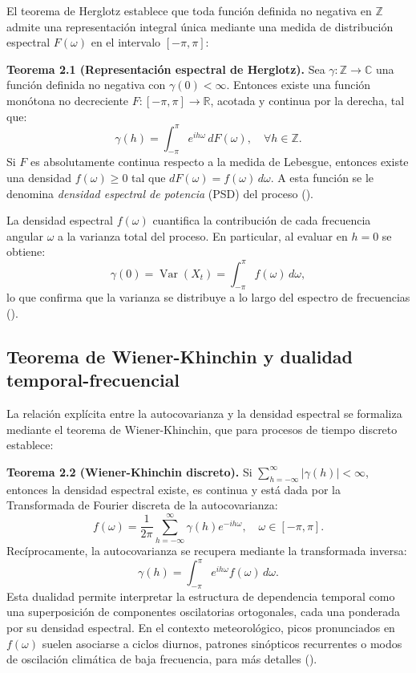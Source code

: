 \documentclass[
  spanish,
  us-letterpaper,
]{scrreprt}
\numberwithin{equation}{section}
\begin{document}
El teorema de Herglotz establece que toda función definida no negativa
en \(\mathbb{Z}\) admite una representación integral única mediante una
medida de distribución espectral \(F(\omega)\) en el intervalo
\([-\pi, \pi]\):

\textbf{Teorema 2.1 (Representación espectral de Herglotz).} Sea
\(\gamma: \mathbb{Z} \to \mathbb{C}\) una función definida no negativa
con \(\gamma(0) < \infty\). Entonces existe una función monótona no
decreciente \(F: [-\pi, \pi] \to \mathbb{R}\), acotada y continua por la
derecha, tal que: \[
\gamma(h) = \int_{-\pi}^{\pi} e^{i h \omega} \, dF(\omega), \quad \forall h \in \mathbb{Z}.
\] Si \(F\) es absolutamente continua respecto a la medida de Lebesgue,
entonces existe una densidad \(f(\omega) \geq 0\) tal que
\(dF(\omega) = f(\omega) \, d\omega\). A esta función se le denomina
\emph{densidad espectral de potencia} (PSD) del proceso
().

La densidad espectral \(f(\omega)\) cuantifica la contribución de cada
frecuencia angular \(\omega\) a la varianza total del proceso. En
particular, al evaluar en \(h=0\) se obtiene: \[
\gamma(0) = \operatorname{Var}(X_t) = \int_{-\pi}^{\pi} f(\omega) \, d\omega,
\] lo que confirma que la varianza se distribuye a lo largo del espectro
de frecuencias ().

\subsection{Teorema de Wiener-Khinchin y dualidad
temporal-frecuencial}\label{teorema-de-wiener-khinchin-y-dualidad-temporal-frecuencial}

La relación explícita entre la autocovarianza y la densidad espectral se
formaliza mediante el teorema de Wiener-Khinchin, que para procesos de
tiempo discreto establece:

\textbf{Teorema 2.2 (Wiener-Khinchin discreto).} Si
\(\sum_{h=-\infty}^{\infty} |\gamma(h)| < \infty\), entonces la densidad
espectral existe, es continua y está dada por la Transformada de Fourier
discreta de la autocovarianza: \[
f(\omega) = \frac{1}{2\pi} \sum_{h=-\infty}^{\infty} \gamma(h) e^{-i h \omega}, \quad \omega \in [-\pi, \pi].
\] Recíprocamente, la autocovarianza se recupera mediante la
transformada inversa: \[
\gamma(h) = \int_{-\pi}^{\pi} e^{i h \omega} f(\omega) \, d\omega.
\] Esta dualidad permite interpretar la estructura de dependencia
temporal como una superposición de componentes oscilatorias ortogonales,
cada una ponderada por su densidad espectral. En el contexto
meteorológico, picos pronunciados en \(f(\omega)\) suelen asociarse a
ciclos diurnos, patrones sinópticos recurrentes o modos de oscilación
climática de baja frecuencia, para más detalles
().
\end{document}
